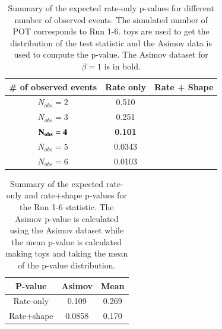

\begin{table}
\centering
\begin{tabular}{| c | c | c |}
\hline
\# of observed events	                        	& Rate only      & Rate + Shape		    	\\
\hline
$N_{obs} = 2$      		                    	& 0.510          &          	\\
$ N_{obs} = 3$      		                    	& 0.251          &          	\\
$ \bf N_{obs} = 4$      		           	         & \bf 0.101     &             \\
$N_{obs} = 5$      		                    	& 0.0343        &        	\\
$N_{obs} = 6$      		                    	& 0.0103        &        	\\
\hline
\end{tabular}
\caption{
Summary of the expected rate-only p-values for different number of 
observed events. The simulated number of POT corresponds to Run 1-6.
\NumToysLarge toys are used to get the distribution of the test statistic and the 
Asimov data is used to compute the p-value.
The Asimov dataset for $\beta=1$ is in bold.
}
\label{tab:summary_sensi_rateonly}
\end{table}




\begin{table}
\centering
\begin{tabular}{| c | c | c |}
\hline
P-value	                                          	& Asimov    	& Mean 		    	\\
\hline
Rate-only                          			& 0.109           	& 0.269                  	\\
Rate+shape                          		& 0.0858          	& 0.170                 	\\
\hline
\end{tabular}
\caption{
Summary of the expected rate-only and rate+shape p-values for 
the Run 1-6 statistic.
The Asimov p-value is calculated using the Asimov dataset while the 
mean p-value is calculated making \NumToysLarge toys and taking the mean 
of the p-value distribution.
}
\label{tab:summary_sensi_lowpot}
\end{table}





